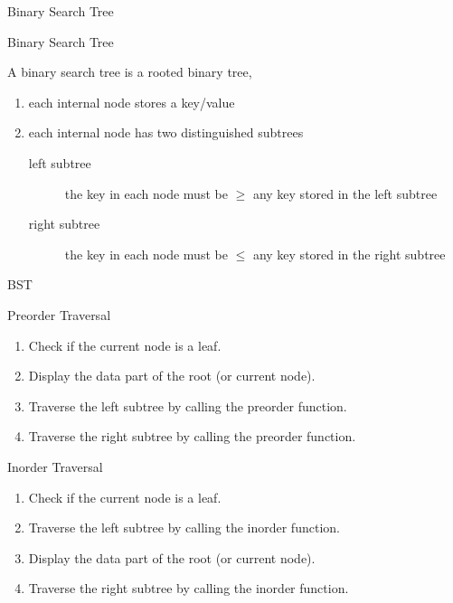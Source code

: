 \begin{frame}{}
  \centerline{\Large Binary Search Tree}
\end{frame}

\begin{frame}{Binary Search Tree}
  \begin{definition}[BST]
    A binary search tree is a rooted binary tree, 
    \begin{enumerate}
      \item each internal node stores a key/value
      \item each internal node has two distinguished subtrees
	\begin{description}
	  \item[left subtree] the key in each node must be $\ge$ any key stored in the left subtree
	  \item[right subtree] the key in each node must be $\le$ any key stored in the right subtree
	\end{description}
    \end{enumerate}
  \end{definition}
\end{frame}

\begin{frame}{BST}
\end{frame}

\begin{frame}{Preorder Traversal}

  \begin{enumerate}
    \item Check if the current node is a leaf.
    \item Display the data part of the root (or current node).
    \item Traverse the left subtree by  calling the preorder function.
    \item Traverse the right subtree by  calling the preorder function.
  \end{enumerate}
\end{frame}

\begin{frame}{Inorder Traversal}

  \begin{enumerate}
    \item Check if the current node is a leaf.
    \item Traverse the left subtree by  calling the inorder function.
    \item Display the data part of the root (or current node).
    \item Traverse the right subtree by  calling the inorder function.
  \end{enumerate}
\end{frame}


